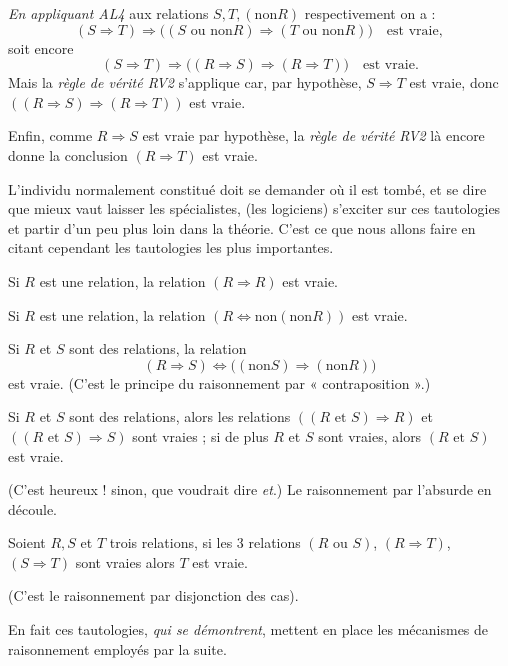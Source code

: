 \emph{En appliquant AL4} aux relations $S,T,(\text{non}R)$ respectivement on a :
\[
(S\Rightarrow T)\Rightarrow\bigl((S\text{ ou }\text{non}R)\Rightarrow(T\text{ ou }\text{non}R)\bigr)\quad\text{est vraie},
\]
soit encore
\[
(S\Rightarrow T)\Rightarrow\bigl((R\Rightarrow S)\Rightarrow(R\Rightarrow T)\bigr)\quad\text{est vraie}.
\]
Mais la \emph{règle de vérité RV2} s'applique car, par hypothèse, $S\Rightarrow T$ est vraie, donc $((R\Rightarrow S)\Rightarrow(R\Rightarrow T))$ est vraie.

Enfin, comme $R\Rightarrow S$ est vraie par hypothèse, la \emph{règle de vérité RV2} là encore donne la conclusion $(R\Rightarrow T)$ est vraie.

L'individu normalement constitué doit se demander où il est tombé, et se dire que mieux vaut laisser les spécialistes, (les logiciens) s'exciter sur ces tautologies et partir d'un peu plus loin dans la théorie. C'est ce que nous allons faire en citant cependant les tautologies les plus importantes.

\begin{description}[leftmargin=4em,labelwidth=3.4em,labelsep=.6em,font=\itshape]
\item[(TL2)] Si $R$ est une relation, la relation $(R\Rightarrow R)$ est vraie.
\item[(TL3)] Si $R$ est une relation, la relation $(R\Leftrightarrow\text{non}(\text{non}R))$ est vraie.
\item[(TL4)] Si $R$ et $S$ sont des relations, la relation
\[
(R\Rightarrow S)\Leftrightarrow\bigl((\text{non}S)\Rightarrow(\text{non}R)\bigr)
\]
est vraie. (C'est le principe du raisonnement par « contraposition ».)
\item[(TL5)] Si $R$ et $S$ sont des relations, alors les relations $((R\text{ et }S)\Rightarrow R)$ et $((R\text{ et }S)\Rightarrow S)$ sont vraies ; si de plus $R$ et $S$ sont vraies, alors $(R\text{ et }S)$ est vraie.

(C'est heureux ! sinon, que voudrait dire \emph{et}.) Le raisonnement par l'absurde en découle.

\item[(TL6)] Soient $R,S$ et $T$ trois relations, si les 3 relations $(R\text{ ou }S)$, $(R\Rightarrow T)$, $(S\Rightarrow T)$ sont vraies alors $T$ est vraie.

(C'est le raisonnement par disjonction des cas).
\end{description}

En fait ces tautologies, \emph{qui se démontrent}, mettent en place les mécanismes de raisonnement employés par la suite.

